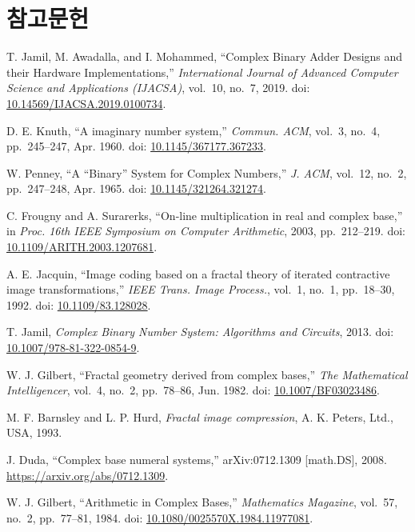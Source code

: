 \documentclass[10pt,a4paper,notitlepage]{report}
\begin{document}
\section{참고문헌}
\begin{thebibliography}{0}
T. Jamil, M. Awadalla, and I. Mohammed,
``Complex Binary Adder Designs and their Hardware Implementations,''
\textit{International Journal of Advanced Computer Science and Applications (IJACSA)},
vol.~10, no.~7, 2019.
doi: \href{https://doi.org/10.14569/IJACSA.2019.0100734}{10.14569/IJACSA.2019.0100734}.

D. E. Knuth,
``A imaginary number system,''
\textit{Commun. ACM},
vol.~3, no.~4, pp.~245--247, Apr. 1960.
doi: \href{https://doi.org/10.1145/367177.367233}{10.1145/367177.367233}.

W. Penney,
``A ``Binary'' System for Complex Numbers,''
\textit{J. ACM},
vol.~12, no.~2, pp.~247--248, Apr. 1965.
doi: \href{https://doi.org/10.1145/321264.321274}{10.1145/321264.321274}.

C. Frougny and A. Surarerks,
``On-line multiplication in real and complex base,''
in \textit{Proc. 16th IEEE Symposium on Computer Arithmetic}, 2003, pp.~212--219.
doi: \href{https://doi.org/10.1109/ARITH.2003.1207681}{10.1109/ARITH.2003.1207681}.

A. E. Jacquin,
``Image coding based on a fractal theory of iterated contractive image transformations,''
\textit{IEEE Trans. Image Process.},
vol.~1, no.~1, pp.~18--30, 1992.
doi: \href{https://doi.org/10.1109/83.128028}{10.1109/83.128028}.

T. Jamil,
\textit{Complex Binary Number System: Algorithms and Circuits},
2013.
doi: \href{https://doi.org/10.1007/978-81-322-0854-9}{10.1007/978-81-322-0854-9}.

W. J. Gilbert,
``Fractal geometry derived from complex bases,''
\textit{The Mathematical Intelligencer},
vol.~4, no.~2, pp.~78--86, Jun. 1982.
doi: \href{https://doi.org/10.1007/BF03023486}{10.1007/BF03023486}.

M. F. Barnsley and L. P. Hurd,
\textit{Fractal image compression},
A. K. Peters, Ltd., USA, 1993.

J. Duda,
``Complex base numeral systems,''
arXiv:0712.1309 [math.DS], 2008.
\url{https://arxiv.org/abs/0712.1309}.

W. J. Gilbert,
``Arithmetic in Complex Bases,''
\textit{Mathematics Magazine},
vol.~57, no.~2, pp.~77--81, 1984.
doi: \href{https://doi.org/10.1080/0025570X.1984.11977081}{10.1080/0025570X.1984.11977081}.


\end{thebibliography}
\end{document}
